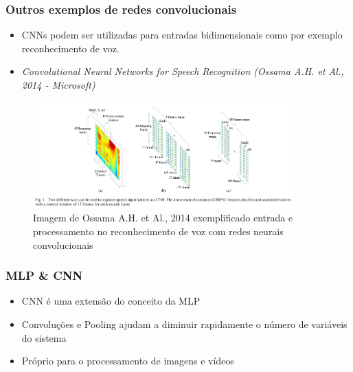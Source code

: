 \documentclass[tikz,10pt]{beamer}
\begin{document}
\begin{frame}
	\frametitle{Outros exemplos de redes convolucionais}
	\begin{itemize}
		\item CNNs podem ser utilizadas para entradas bidimensionais como por exemplo reconhecimento de voz.
		\item \textit{Convolutional Neural Networks for Speech Recognition (Ossama A.H. et Al., 2014 - Microsoft)}
	\end{itemize}
	\begin{center}
		\begin{figure}
		\includegraphics[width=0.9\textwidth]{images/fabio/ossama_et_al}
		\caption{Imagem de Ossama A.H. et Al., 2014 exemplificado entrada e processamento no reconhecimento de voz com redes neurais convolucionais}
		\end{figure}
	\end{center}

\end{frame}

\begin{frame}
	\frametitle{MLP \& CNN}
	\centering
	\begin{itemize}
		\item CNN é uma extensão do conceito da MLP
		\item Convoluções e Pooling ajudam a diminuir rapidamente o número de variáveis do sistema
		\item Próprio para o processamento de imagens e vídeos		
	\end{itemize}
\end{frame}

\end{document}
